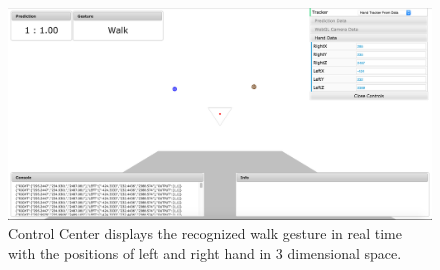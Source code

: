 \begin{figure}
	[h] \centering 
	\includegraphics[width=125mm]{figures/result/cc-walk.jpg} \caption{Control Center displays the recognized walk gesture in real time with the positions of left and right hand in 3 dimensional space. } \label{fg:cc:walk} 
\end{figure}
